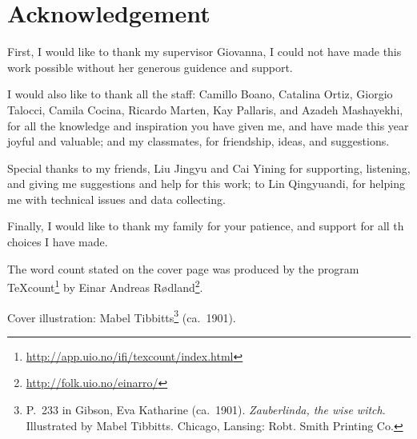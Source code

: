 \chapter*{Acknowledgement}

First, I would like to thank my supervisor Giovanna, I could not have made this work possible without her generous guidence and support.

I would also like to thank all the  staff: Camillo Boano, Catalina Ortiz, Giorgio Talocci, Camila Cocina, Ricardo Marten, Kay Pallaris, and Azadeh Mashayekhi, for all the knowledge and inspiration you have given me, and have made this year joyful and valuable; and my classmates, for friendship, ideas, and suggestions.

Special thanks to my friends, Liu Jingyu and Cai Yining for supporting, listening, and giving me suggestions and help for this work; to Lin Qingyuandi, for helping me with technical issues and data collecting.

Finally, I would like to thank my family for your patience, and support for all th choices I have made.

The word count stated on the cover page was produced by the program \TeX count\footnote{\url{http://app.uio.no/ifi/texcount/index.html}} by Einar Andreas Rødland\footnote{\url{http://folk.uio.no/einarro/}}.

Cover illustration: Mabel Tibbitts\footnote{P.~233 in Gibson, Eva Katharine (ca.~1901). \textit{Zauberlinda, the wise witch}. Illustrated by Mabel Tibbitts. Chicago, Lansing: Robt. Smith Printing Co.} (ca.~1901).
